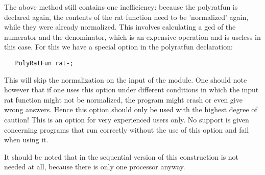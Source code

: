 The above method still contains one inefficiency: because the polyratfun is 
declared again, the contents of the rat function need to be 'normalized' 
again, while they were already normalized. This involves calculating a gcd 
of the numerator and the denominator, which is an expensive operation 
and is useless in this case. For this we have a special option in the 
polyratfun declaration:
\begin{verbatim}
   PolyRatFun rat-;
\end{verbatim}
This will skip the normalization on the input of the module. One should 
note however that if one uses this option under different conditions in 
which the input rat function might not be normalized, the program might 
crash or even give wrong answers. Hence this option should only be used 
with the highest degree of caution! This is an option for very experienced 
users only. No support is given concerning programs that run correctly 
without the use of this option and fail when using it.

It should be noted that in the sequential version of \FORM{} this 
construction is not needed at all, because there is only one processor 
anyway.

